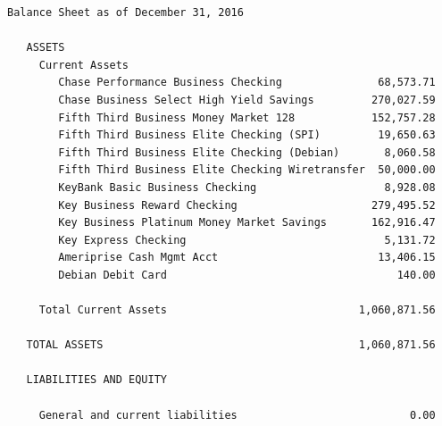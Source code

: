 \documentclass[letterpaper]{report}
\begin{document}
\begin{verbatim}
Balance Sheet as of December 31, 2016

   ASSETS
     Current Assets
        Chase Performance Business Checking               68,573.71
        Chase Business Select High Yield Savings         270,027.59
        Fifth Third Business Money Market 128            152,757.28
        Fifth Third Business Elite Checking (SPI)         19,650.63
        Fifth Third Business Elite Checking (Debian)       8,060.58
        Fifth Third Business Elite Checking Wiretransfer  50,000.00
        KeyBank Basic Business Checking                    8,928.08
        Key Business Reward Checking                     279,495.52
        Key Business Platinum Money Market Savings       162,916.47
        Key Express Checking                               5,131.72
        Ameriprise Cash Mgmt Acct                         13,406.15
        Debian Debit Card                                    140.00

     Total Current Assets                              1,060,871.56

   TOTAL ASSETS                                        1,060,871.56

   LIABILITIES AND EQUITY

     General and current liabilities                           0.00


\end{verbatim}
\end{document}
